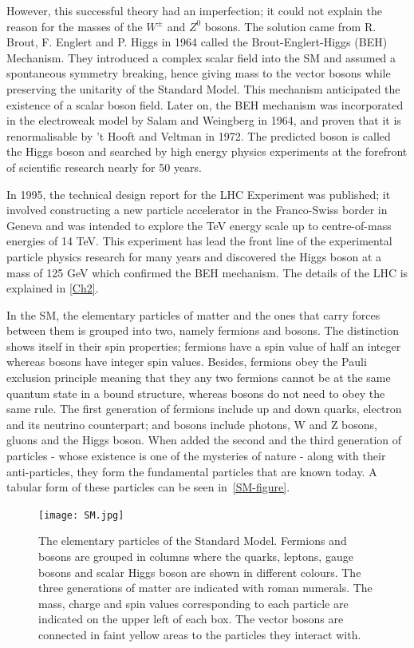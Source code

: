 However, this successful theory had an imperfection; it could not explain the reason for the masses of the $W^\pm$ and $Z^0$ bosons. The solution came from R. Brout, F. Englert and P. Higgs in 1964 called the Brout-Englert-Higgs (BEH) Mechanism\cite{Higgs1964, BroutEnglert, Guralnik1964}. They introduced a complex scalar field into the SM and assumed a spontaneous symmetry breaking, hence giving mass to the vector bosons while preserving the unitarity of the Standard Model. This mechanism anticipated the existence of a scalar boson field. Later on, the BEH mechanism was incorporated in the electroweak model by Salam and Weingberg in 1964\cite{salam}, and proven that it is renormalisable by 't Hooft and Veltman in 1972\cite{thooft}. The predicted boson is called the Higgs boson and searched by high energy physics experiments at the forefront of scientific research nearly for 50 years.

In 1995, the technical design report for the LHC Experiment was published\cite{lhc-tdr}; it involved constructing a new particle accelerator in the Franco-Swiss border in Geneva and was intended to explore the TeV energy scale up to centre-of-mass energies of 14 TeV. This experiment has lead the front line of the experimental particle physics research for many years and discovered the Higgs boson at a mass of 125 GeV which confirmed the BEH mechanism. The details of the LHC is explained in \autoref{Ch2}.

In the SM, the elementary particles of matter and the ones that carry forces between them is grouped into two, namely fermions and bosons. The distinction shows itself in their spin properties; fermions have a spin value of half an integer whereas bosons have integer spin values. Besides, fermions obey the Pauli exclusion principle meaning that they any two fermions cannot be at the same quantum state in a bound structure, whereas bosons do not need to obey the same rule. The first generation of fermions include up and down quarks, electron and its neutrino counterpart; and bosons include photons, W and Z bosons, gluons and the Higgs boson. When added the second and the third generation of particles - whose existence is one of the mysteries of nature - along with their anti-particles, they form the fundamental particles that are known today. A tabular form of these particles can be seen in~\autoref{SM-figure}.

\vspace{6pt}
\begin{figure}[ht]
	\centering
	\texttt{[image: SM.jpg]}
	\vspace{-0.5cm}
	\vspace{6pt}
	\caption{The elementary particles of the Standard Model. Fermions and bosons are grouped in columns where the quarks, leptons, gauge bosons and scalar Higgs boson are shown in different colours. The three generations of matter are indicated with roman numerals. The mass, charge and spin values corresponding to each particle are indicated on the upper left of each box. The vector bosons are connected in faint yellow areas to the particles they interact with.}
	\label{SM-figure}
\end{figure}


